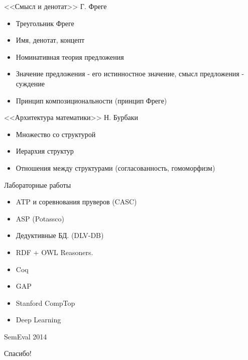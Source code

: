 \documentclass{beamer}
\begin{document}
\begin{frame}{<<Смысл и денотат>> Г. Фреге}
    \begin{itemize}
        \item Треугольник Фреге
        \item Имя, денотат, концепт
        \item Номинативная теория предложения
        \item Значение предложения - его истинностное значение, смысл предложения - суждение
        \item Принцип композициональности (принцип Фреге)
    \end{itemize}
\end{frame}

\begin{frame}{<<Архитектура математики>> Н. Бурбаки}
    \begin{itemize}
        \item Множество со структурой
        \item Иерархия структур
        \item Отношения между структурами (согласованность, гомоморфизм)
    \end{itemize}
\end{frame}

\begin{frame}{Лабораторные работы}
    \begin{itemize}
        \item ATP и соревнования пруверов (CASC)
        \item ASP (Potassco)
        \item Дедуктивные БД. (DLV-DB)
        \item RDF + OWL Reasoners. 
        \item Coq
        \item GAP 
        \item Stanford CompTop 
        \item Deep Learning
    \end{itemize}
\end{frame}

\begin{frame}{SemEval 2014}
\end{frame}


\begin{frame}{}
    \thispagestyle{empty}
    \begin{center}
        {\large Спасибо!}
    \end{center}
\end{frame}


\end{document}
